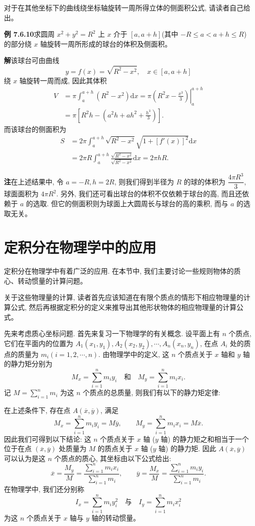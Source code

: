\documentclass[UTF8,12pt,a4paper,fontset=fandol]{ctexart}
\begin{document}
对于在其他坐标下的曲线绕坐标轴旋转一周所得立体的侧面积公式, 请读者自己给出。

\noindent\textbf{例 7.6.10}\quad 求圆周 $x^2+y^2=R^2$ 上 $x$ 介于 $[a,a+h]$(其中 $-R\leq a<a+h\leq R$) 的部分绕 $x$ 轴旋转一周所形成的球台的体积及侧面积。

\noindent\textbf{解}\quad 该球台可由曲线
\[
  y=f(x)=\sqrt{R^2-x^2},\quad x\in[a,a+h]
\]
绕 $x$ 轴旋转一周而成, 因此其体积
\[
\begin{aligned}
  V&=\pi\int_a^{a+h}(R^2-x^2)\mathrm dx
  =\left.\pi\left(R^2x-\frac{x^3}{3}\right)\right|_a^{a+h}\\
  &=\pi\left[R^2h-\left(a^2h+ah^2+\frac{h^3}{3}\right)\right].
\end{aligned}
\]
而该球台的侧面积为
\[
\begin{aligned}
  S&=2\pi\int_a^{a+h}\sqrt{R^2-x^2}\sqrt{1+[f'(x)]^2}\mathrm dx\\
  &=2\pi R\int_a^{a+h}\frac{\sqrt{R^2-x^2}}{\sqrt{R^2-x^2}}\mathrm dx
  =2\pi hR.
\end{aligned}
\]

\noindent\textbf{注}\quad 在上述结果中, 令 $a=-R,h=2R$, 则我们得到半径为 $R$ 的球的体积为 $\dfrac{4\pi R^3}{3}$, 球面面积为 $4\pi R^2$. 另外, 我们还可看出球台的体积不仅依赖于球台的高, 而且还依赖于 $a$ 的选取. 但它的侧面积则为球面上大圆周长与球台的高的乘积, 而与 $a$ 的选取无关。

\section{定积分在物理学中的应用}

定积分在物理学中有着广泛的应用. 在本节中, 我们主要讨论一些规则物体的质心、转动惯量的计算问题。

关于这些物理量的计算, 读者首先应该知道在有限个质点的情形下相应物理量的计算公式, 然后再根据定积分的定义来推导出其他形状物体的相应物理量的计算公式。

先来考虑质心坐标问题. 首先来复习一下物理学的有关概念. 设平面上有 $n$ 个质点, 它们在平面内的位置为 $A_1(x_1,y_1),A_2(x_2,y_2),\cdots,A_n(x_n,y_n)$, 在点 $A_i$ 处的质点的质量为 $m_i(i=1,2,\cdots,n)$. 由物理学中的定义, 这 $n$ 个质点关于 $x$ 轴和 $y$ 轴的静力矩分别为
\[
  M_x=\sum_{i=1}^n m_i y_i\quad\text{和}\quad M_y=\sum_{i=1}^n m_i x_i.
\]
记 $M=\sum_{i=1}^n m_i$ 为这 $n$ 个质点的总质量, 则我们有以下的静力矩定律:

在上述条件下, 存在点 $A(\overline x,\overline y)$, 满足
\[
  M_x=\sum_{i=1}^n m_i y_i=M\overline y,\qquad
  M_y=\sum_{i=1}^n m_i x_i=M\overline x.
\]
因此我们可得到以下结论: 这 $n$ 个质点关于 $x$ 轴 ($y$ 轴) 的静力矩之和相当于一个位于在点 $(\overline x,\overline y)$ 处质量为 $M$ 的质点关于 $x$ 轴 ($y$ 轴) 的静力矩. 因此 $A(\overline x,\overline y)$ 可以认为是这 $n$ 个质点的质心, 其坐标由以下公式给出:
\[
  \overline x=\frac{M_y}{M}
  =\frac{\sum_{i=1}^n m_i x_i}{\sum_{i=1}^n m_i},\qquad
  \overline y=\frac{M_x}{M}
  =\frac{\sum_{i=1}^n m_i y_i}{\sum_{i=1}^n m_i}.
\]
在物理学中, 我们还分别称
\[
  I_x=\sum_{i=1}^n m_i y_i^2\quad\text{与}\quad I_y=\sum_{i=1}^n m_i x_i^2
\]
为这 $n$ 个质点关于 $x$ 轴与 $y$ 轴的转动惯量。
\end{document}
